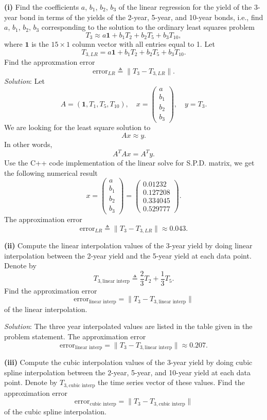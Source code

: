 \documentclass[paper=a4, fontsize=11pt]{scrartcl} %
\numberwithin{equation}{section} %
\numberwithin{figure}{section} %
\numberwithin{table}{section} %
\begin{document}
\textbf{(i)} Find the coefficients $a$, $b_1$, $b_2$, $b_3$ of the linear regression for the yield
of the 3-year bond in terms of  the yields of the 2-year, 5-year, and 10-year bonds, i.e., find
 $a$, $b_1$, $b_2$, $b_3$ corresponding to the solution to the ordinary least squares problem
$$
T_3 \approx a\mathbf{1} + b_1 T_2 + b_2 T_5 + b_3 T_{10},
$$
where $\mathbf{1}$ is the $15\times 1$ column vector with all entries equal to 1. Let
$$
T_{3,LR} = a\mathbf{1} + b_1 T_2 + b_2 T_5 + b_3 T_{10}.
$$
Find the approxmation error
$$
\text{error}_{LR} \triangleq \parallel T_3 - T_{3,LR} \parallel.
$$
\textit{Solution}: Let
$$
A = \left( \mathbf{1}, T_1, T_5, T_{10} \right), \quad x = \begin{pmatrix}
a\\b_1\\b_2\\b_3
\end{pmatrix}, \quad y = T_3.
$$
We are looking for the least square solution to
$$
Ax \approx y.
$$
In other words,
$$
A^T A x = A^T y.
$$
Use the C++ code implementation of the linear solve for S.P.D. matrix, we get the following numerical result
$$
x = \begin{pmatrix}
a\\b_1\\b_2\\b_3
\end{pmatrix}
= 
\begin{pmatrix}
0.01232\\0.127208\\0.334045\\0.529777
\end{pmatrix}.
$$
The approximation error
$$
\text{error}_{LR} \triangleq \parallel T_3 - T_{3,LR} \parallel \approx 0.043.
$$

\textbf{(ii)} Compute the linear interpolation values of the 3-year yield by doing
linear interpolation between the 2-year yield and the 5-year yield at each
data point. Denote by 
$$
T_{3,\text{linear interp}} \triangleq \frac{2}{3}T_2 + \frac{1}{3}T_5.
$$
Find the approximation error
$$
\text{error}_{\text{linear interp}} = \parallel T_3 - T_{3,\text{linear interp}}  \parallel
$$
of the linear interpolation.

\textit{Solution}: The three year interpolated values are listed in the table given in the problem statement. The approximation error
$$
\text{error}_{\text{linear interp}} = \parallel T_3 - T_{3,\text{linear interp}}  \parallel  \approx 0.207.
$$

\textbf{(iii)} Compute the cubic interpolation values of the 3-year yield by doing cubic spline interpolation between the 2-year, 5-year, and 10-year yield at each data point. Denote by
$T_{3,\text{cubic interp}}$ the time series vector of these values. Find the approximation error
$$
\text{error}_{\text{cubic interp}} = \parallel T_3 - T_{3,\text{cubic interp}}  \parallel
$$
of the cubic spline interpolation.
\end{document}
